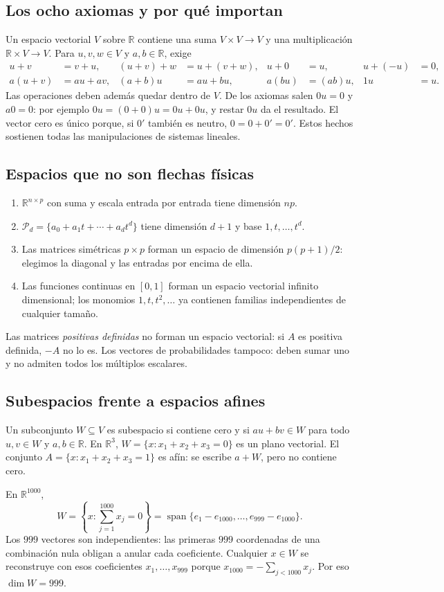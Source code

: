 \documentclass[11pt,a4paper]{article}
\newcommand{\R}{\mathbb R}
\DeclareMathOperator{\spanop}{span}
\theoremstyle{definition}
\begin{document}
\subsection{Los ocho axiomas y por qué importan}
Un espacio vectorial $V$ sobre $\R$ contiene una suma $V\times V\to V$ y una multiplicación $\R\times V\to V$. Para $u,v,w\in V$ y $a,b\in\R$, exige
\begin{align*}
u+v&=v+u,& (u+v)+w&=u+(v+w),& u+0&=u,&u+(-u)&=0,\\
a(u+v)&=au+av,&(a+b)u&=au+bu,&a(bu)&=(ab)u,&1u&=u.
\end{align*}
Las operaciones deben además quedar dentro de $V$. De los axiomas salen $0u=0$ y $a0=0$: por ejemplo $0u=(0+0)u=0u+0u$, y restar $0u$ da el resultado. El vector cero es único porque, si $0'$ también es neutro, $0=0+0'=0'$. Estos hechos sostienen todas las manipulaciones de sistemas lineales.
\subsection{Espacios que no son flechas físicas}
\begin{enumerate}
\item $\R^{n\times p}$ con suma y escala entrada por entrada tiene dimensión $np$.
\item $\mathcal P_d=\{a_0+a_1t+\cdots+a_dt^d\}$ tiene dimensión $d+1$ y base $1,t,\ldots,t^d$.
\item Las matrices simétricas $p\times p$ forman un espacio de dimensión $p(p+1)/2$: elegimos la diagonal y las entradas por encima de ella.
\item Las funciones continuas en $[0,1]$ forman un espacio vectorial infinito dimensional; los monomios $1,t,t^2,\ldots$ ya contienen familias independientes de cualquier tamaño.
\end{enumerate}
Las matrices \emph{positivas definidas} no forman un espacio vectorial: si $A$ es positiva definida, $-A$ no lo es. Los vectores de probabilidades tampoco: deben sumar uno y no admiten todos los múltiplos escalares.
\subsection{Subespacios frente a espacios afines}
Un subconjunto $W\subseteq V$ es subespacio si contiene cero y si $au+bv\in W$ para todo $u,v\in W$ y $a,b\in\R$. En $\R^3$, $W=\{x:x_1+x_2+x_3=0\}$ es un plano vectorial. El conjunto $A=\{x:x_1+x_2+x_3=1\}$ es afín: se escribe $a+W$, pero no contiene cero.
\begin{ejemplo}
En $\R^{1000}$,
\[
W=\left\{x:\sum_{j=1}^{1000}x_j=0\right\}
=\spanop\{e_1-e_{1000},\ldots,e_{999}-e_{1000}\}.
\]
Los $999$ vectores son independientes: las primeras $999$ coordenadas de una combinación nula obligan a anular cada coeficiente. Cualquier $x\in W$ se reconstruye con esos coeficientes $x_1,\ldots,x_{999}$ porque $x_{1000}=-\sum_{j<1000}x_j$. Por eso $\dim W=999$.
\end{ejemplo}
\end{document}

